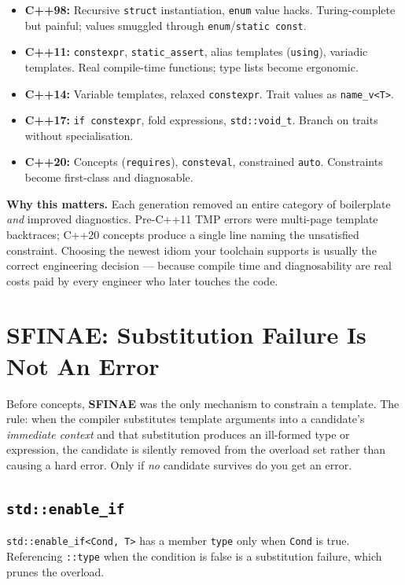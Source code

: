 \begin{itemize}
\item \textbf{C++98:} Recursive \texttt{struct} instantiation, \texttt{enum} value hacks. Turing-complete but painful; values smuggled through \texttt{enum}/\texttt{static const}.
\item \textbf{C++11:} \texttt{constexpr}, \texttt{static\_assert}, alias templates (\texttt{using}), variadic templates. Real compile-time functions; type lists become ergonomic.
\item \textbf{C++14:} Variable templates, relaxed \texttt{constexpr}. Trait values as \texttt{name\_v<T>}.
\item \textbf{C++17:} \texttt{if constexpr}, fold expressions, \texttt{std::void\_t}. Branch on traits without specialisation.
\item \textbf{C++20:} Concepts (\texttt{requires}), \texttt{consteval}, constrained \texttt{auto}. Constraints become first-class and diagnosable.
\end{itemize}

\textbf{Why this matters.} Each generation removed an entire category of boilerplate \emph{and} improved diagnostics. Pre-C++11 TMP errors were multi-page template backtraces; C++20 concepts produce a single line naming the unsatisfied constraint. Choosing the newest idiom your toolchain supports is usually the correct engineering decision --- because compile time and diagnosability are real costs paid by every engineer who later touches the code.

\section{SFINAE: Substitution Failure Is Not An Error}

Before concepts, \textbf{SFINAE} was the only mechanism to constrain a template. The rule: when the compiler substitutes template arguments into a candidate's \emph{immediate context} and that substitution produces an ill-formed type or expression, the candidate is silently removed from the overload set rather than causing a hard error. Only if \emph{no} candidate survives do you get an error.

\subsection{\texttt{std::enable\_if}}

\texttt{std::enable\_if<Cond, T>} has a member \texttt{type} only when \texttt{Cond} is true. Referencing \texttt{::type} when the condition is false is a substitution failure, which prunes the overload.

